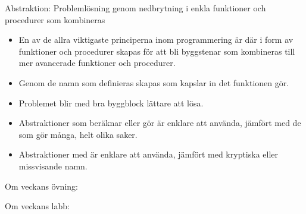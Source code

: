 \begin{Slide}{Abstraktion: Problemlösning genom nedbrytning i enkla funktioner och procedurer som kombineras}\SlideFontSmall
\begin{itemize}
\item En av de allra viktigaste principerna inom programmering är  där   i form av funktioner och procedurer skapas för att bli byggstenar som kombineras till mer avancerade funktioner och procedurer.

\item Genom de namn som definieras skapas  som kapslar in det funktionen gör.

\item Problemet blir med bra byggblock lättare att lösa.

\item Abstraktioner som beräknar eller gör  är enklare att använda, jämfört med de som gör många, helt olika saker.

\item Abstraktioner med  är enklare att använda, jämfört med kryptiska eller missvisande namn.
\end{itemize}

\end{Slide}

\ifkompendium\else

\begin{Slide}{Om veckans övning: }\SlideFontSmall

\begin{itemize}

\end{itemize}

\end{Slide}

\begin{Slide}{Om veckans labb: }
\begin{itemize}

\end{itemize}
\end{Slide}

\fi

